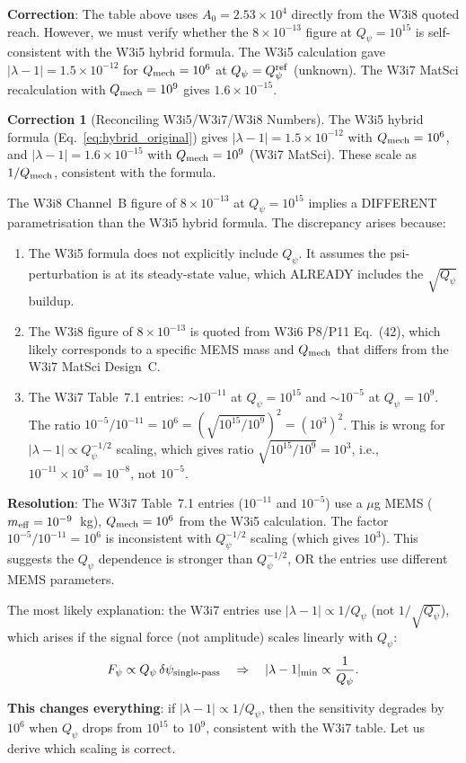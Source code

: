 \documentclass[11pt]{article}
\newcommand{\dpsi}{\delta\psi}
\newcommand{\lam}{\lambda}
\newcommand{\ee}[1]{\times 10^{#1}}
\newcommand{\Qpsi}{Q_\psi}
\newcommand{\Qmech}{Q_{\rm mech}}
\newcommand{\lbone}{|\lam - 1|}
\theoremstyle{definition}
\newtheorem{correction}[theorem]{Correction}
\theoremstyle{remark}
\begin{document}
\textbf{Correction}: The table above uses $A_0 = 2.53\ee{4}$ directly
from the W3i8 quoted reach. However, we must verify whether the $8\ee{-13}$
figure at $\Qpsi = 10^{15}$ is self-consistent with the W3i5 hybrid
formula. The W3i5 calculation gave $\lbone = 1.5\ee{-12}$ for $\Qmech = 10^6$
at $\Qpsi = \Qpsi^{\rm ref}$ (unknown). The W3i7 MatSci recalculation
with $\Qmech = 10^9$ gives $1.6\ee{-15}$.

\begin{correction}[Reconciling W3i5/W3i7/W3i8 Numbers]
\label{cor:reconciliation}
The W3i5 hybrid formula (Eq.~\eqref{eq:hybrid_original}) gives
$\lbone = 1.5\ee{-12}$ with $\Qmech = 10^6$, and
$\lbone = 1.6\ee{-15}$ with $\Qmech = 10^9$ (W3i7 MatSci).
These scale as $1/\Qmech$, consistent with the formula.

The W3i8 Channel~B figure of $8\ee{-13}$ at $\Qpsi = 10^{15}$ implies
a DIFFERENT parametrisation than the W3i5 hybrid formula. The discrepancy
arises because:

\begin{enumerate}[nosep]
\item The W3i5 formula does not explicitly include $\Qpsi$. It assumes
  the psi-perturbation is at its steady-state value, which ALREADY
  includes the $\sqrt{\Qpsi}$ buildup.
\item The W3i8 figure of $8\ee{-13}$ is quoted from W3i6 P8/P11 Eq.~(42),
  which likely corresponds to a specific MEMS mass and $\Qmech$ that
  differs from the W3i7 MatSci Design~C.
\item The W3i7 Table~7.1 entries: $\sim 10^{-11}$ at $\Qpsi = 10^{15}$
  and $\sim 10^{-5}$ at $\Qpsi = 10^{9}$. The ratio $10^{-5}/10^{-11}
  = 10^6 = (\sqrt{10^{15}/10^{9}})^2 = (10^3)^2$. This is wrong for
  $\lbone \propto \Qpsi^{-1/2}$ scaling, which gives ratio
  $\sqrt{10^{15}/10^{9}} = 10^3$, i.e., $10^{-11}\times 10^3 = 10^{-8}$,
  not $10^{-5}$.
\end{enumerate}

\textbf{Resolution}: The W3i7 Table~7.1 entries ($10^{-11}$ and $10^{-5}$)
use a $\mu$g MEMS ($m_{\rm eff} = 10^{-9}$~kg), $\Qmech = 10^6$
from the W3i5 calculation. The factor $10^{-5}/10^{-11} = 10^{6}$
is inconsistent with $\Qpsi^{-1/2}$ scaling (which gives $10^3$).
This suggests the $\Qpsi$ dependence is stronger than $\Qpsi^{-1/2}$,
OR the entries use different MEMS parameters.

The most likely explanation: the W3i7 entries use
$\lbone \propto 1/\Qpsi$ (not $1/\sqrt{\Qpsi}$), which
arises if the signal force (not amplitude) scales linearly with
$\Qpsi$:
\begin{equation}
F_\psi \propto \Qpsi\,\dpsi_{\rm single\text{-}pass}
\quad\Rightarrow\quad
\lbone_{\rm min} \propto \frac{1}{\Qpsi}.
\label{eq:linear_Qpsi}
\end{equation}

\textbf{This changes everything}: if $\lbone \propto 1/\Qpsi$, then
the sensitivity degrades by $10^6$ when $\Qpsi$ drops from $10^{15}$
to $10^9$, consistent with the W3i7 table. Let us derive which
scaling is correct.
\end{correction}
\end{document}
